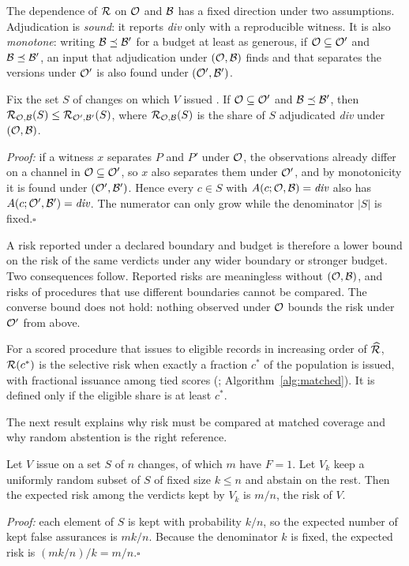 The dependence of $\mathcal{R}$ on $\mathcal{O}$ and $\mathcal{B}$ has a fixed direction under two assumptions. Adjudication is \emph{sound}: it reports \textit{div} only with a reproducible witness. It is also \emph{monotone}: writing $\mathcal{B}\preceq\mathcal{B}'$ for a budget at least as generous, if $\mathcal{O}\subseteq\mathcal{O}'$ and $\mathcal{B}\preceq\mathcal{B}'$, an input that adjudication under $(\mathcal{O},\mathcal{B})$ finds and that separates the versions under $\mathcal{O}'$ is also found under $(\mathcal{O}',\mathcal{B}')$.

\begin{proposition}\label{prop:mono}
Fix the set $S$ of changes on which $V$ issued \NDO{}. If $\mathcal{O}\subseteq\mathcal{O}'$ and $\mathcal{B}\preceq\mathcal{B}'$, then $\mathcal{R}_{\mathcal{O},\mathcal{B}}(S)\le\mathcal{R}_{\mathcal{O}',\mathcal{B}'}(S)$, where $\mathcal{R}_{\mathcal{O},\mathcal{B}}(S)$ is the share of $S$ adjudicated \textit{div} under $(\mathcal{O},\mathcal{B})$.
\end{proposition}
\emph{Proof:} if a witness $x$ separates $P$ and $P'$ under $\mathcal{O}$, the observations already differ on a channel in $\mathcal{O}\subseteq\mathcal{O}'$, so $x$ also separates them under $\mathcal{O}'$, and by monotonicity it is found under $(\mathcal{O}',\mathcal{B}')$. Hence every $c\in S$ with $A(c;\mathcal{O},\mathcal{B})=\textit{div}$ also has $A(c;\mathcal{O}',\mathcal{B}')=\textit{div}$. The numerator can only grow while the denominator $|S|$ is fixed.\hfill$\square$

A risk reported under a declared boundary and budget is therefore a lower bound on the risk of the same verdicts under any wider boundary or stronger budget. Two consequences follow. Reported risks are meaningless without $(\mathcal{O},\mathcal{B})$, and risks of procedures that use different boundaries cannot be compared. The converse bound does not hold: nothing observed under $\mathcal{O}$ bounds the risk under $\mathcal{O}'$ from above.

\begin{definition}
For a scored procedure that issues \NDO{} to eligible records in increasing order of $\widehat{\mathcal{R}}$, $\mathcal{R}(c^\ast)$ is the selective risk when exactly a fraction $c^\ast$ of the population is issued, with fractional issuance among tied scores (; Algorithm~\ref{alg:matched}). It is defined only if the eligible share is at least $c^\ast$.
\end{definition}

The next result explains why risk must be compared at matched coverage and why random abstention is the right reference.

\begin{proposition}\label{prop:random}
Let $V$ issue \NDO{} on a set $S$ of $n$ changes, of which $m$ have $F=1$. Let $V_k$ keep a uniformly random subset of $S$ of fixed size $k\le n$ and abstain on the rest. Then the expected risk among the verdicts kept by $V_k$ is $m/n$, the risk of $V$.
\end{proposition}
\emph{Proof:} each element of $S$ is kept with probability $k/n$, so the expected number of kept false assurances is $mk/n$. Because the denominator $k$ is fixed, the expected risk is $(mk/n)/k=m/n$.\hfill$\square$

